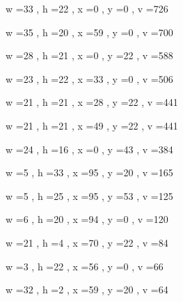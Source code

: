 \documentclass[11pt]{article}
\begin{document}
w =33 , h =22 , x =0 , y =0 , v =726
\par
w =35 , h =20 , x =59 , y =0 , v =700
\par
w =28 , h =21 , x =0 , y =22 , v =588
\par
w =23 , h =22 , x =33 , y =0 , v =506
\par
w =21 , h =21 , x =28 , y =22 , v =441
\par
w =21 , h =21 , x =49 , y =22 , v =441
\par
w =24 , h =16 , x =0 , y =43 , v =384
\par
w =5 , h =33 , x =95 , y =20 , v =165
\par
w =5 , h =25 , x =95 , y =53 , v =125
\par
w =6 , h =20 , x =94 , y =0 , v =120
\par
w =21 , h =4 , x =70 , y =22 , v =84
\par
w =3 , h =22 , x =56 , y =0 , v =66
\par
w =32 , h =2 , x =59 , y =20 , v =64
\par
\newpage
\end{document}
